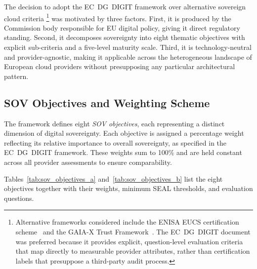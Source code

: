 The decision to adopt the EC~DG~DIGIT framework over alternative sovereign cloud criteria%
\footnote{Alternative frameworks considered include the ENISA EUCS certification scheme~\cite{ENISA_EUCS_2023} and the GAIA-X Trust Framework~\cite{GAIAX_Architecture_2023}. The EC~DG~DIGIT document was preferred because it provides explicit, question-level evaluation criteria that map directly to measurable provider attributes, rather than certification labels that presuppose a third-party audit process.}
was motivated by three factors. First, it is produced by the Commission body responsible for EU digital policy, giving it direct regulatory standing. Second, it decomposes sovereignty into eight thematic objectives with explicit sub-criteria and a five-level maturity scale. Third, it is technology-neutral and provider-agnostic, making it applicable across the heterogeneous landscape of European cloud providers without presupposing any particular architectural pattern.

\subsection{SOV Objectives and Weighting Scheme}
\label{subsec:sov_objectives}

The framework defines eight \textit{SOV objectives}, each representing a distinct dimension of digital sovereignty. Each objective is assigned a percentage weight reflecting its relative importance to overall sovereignty, as specified in the EC~DG~DIGIT framework. These weights sum to 100\% and are held constant across all provider assessments to ensure comparability.

Tables~\ref{tab:sov_objectives_a} and~\ref{tab:sov_objectives_b} list the eight objectives together with their weights, minimum SEAL thresholds, and evaluation questions.

